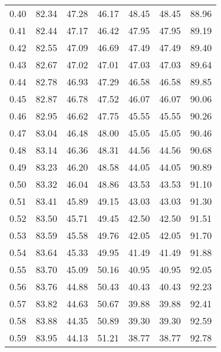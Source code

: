 \begin{tabular}{|c|c|c|c|c|c|c|}
      0.40 &     82.34 &     47.28 &      46.17 &   48.45 &      48.45 &         88.96 \\
      0.41 &     82.44 &     47.17 &      46.42 &   47.95 &      47.95 &         89.19 \\
      0.42 &     82.55 &     47.09 &      46.69 &   47.49 &      47.49 &         89.40 \\
      0.43 &     82.67 &     47.02 &      47.01 &   47.03 &      47.03 &         89.64 \\
      0.44 &     82.78 &     46.93 &      47.29 &   46.58 &      46.58 &         89.85 \\
      0.45 &     82.87 &     46.78 &      47.52 &   46.07 &      46.07 &         90.06 \\
      0.46 &     82.95 &     46.62 &      47.75 &   45.55 &      45.55 &         90.26 \\
      0.47 &     83.04 &     46.48 &      48.00 &   45.05 &      45.05 &         90.46 \\
      0.48 &     83.14 &     46.36 &      48.31 &   44.56 &      44.56 &         90.68 \\
      0.49 &     83.23 &     46.20 &      48.58 &   44.05 &      44.05 &         90.89 \\
      0.50 &     83.32 &     46.04 &      48.86 &   43.53 &      43.53 &         91.10 \\
      0.51 &     83.41 &     45.89 &      49.15 &   43.03 &      43.03 &         91.30 \\
      0.52 &     83.50 &     45.71 &      49.45 &   42.50 &      42.50 &         91.51 \\
      0.53 &     83.59 &     45.58 &      49.76 &   42.05 &      42.05 &         91.70 \\
      0.54 &     83.64 &     45.33 &      49.95 &   41.49 &      41.49 &         91.88 \\
      0.55 &     83.70 &     45.09 &      50.16 &   40.95 &      40.95 &         92.05 \\
      0.56 &     83.76 &     44.88 &      50.43 &   40.43 &      40.43 &         92.23 \\
      0.57 &     83.82 &     44.63 &      50.67 &   39.88 &      39.88 &         92.41 \\
      0.58 &     83.88 &     44.35 &      50.89 &   39.30 &      39.30 &         92.59 \\
      0.59 &     83.95 &     44.13 &      51.21 &   38.77 &      38.77 &         92.78 \\

\end{tabular}
